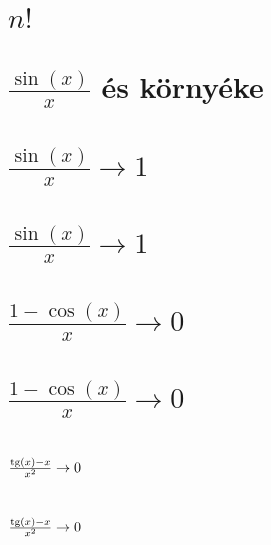 \begin{spacing}{1.2}
\section*{$n!$} \label{DBnthroot3Mo}
\Mo{

}
\vspace{0.5cm}
\newpage
\section*{$\frac{\sin(x)}{x}$ és környéke} \label{DBsin}
\newline
{}
\newline
{}
\vspace{0.5cm}
\newpage
\section*{$\frac{\sin(x)}{x}\to 1$} \label{DBsin1}
\Fa{

}
\vspace{0.5cm}
\newpage
\section*{$\frac{\sin(x)}{x}\to 1$} \label{DBsin1Mo}
\Mo{

}
\vspace{0.5cm}
\newpage
\section*{$\frac{1-\cos(x)}{x}\to 0$} \label{DBsin2}
\Fa{

}
\vspace{0.5cm}
\newpage
\section*{$\frac{1-\cos(x)}{x}\to 0$} \label{DBsin2Mo}
\Mo{

}
\vspace{0.5cm}
\newpage
\section*{$\frac{\text{tg}(x)-x}{x^2}\to 0$} \label{DBsin3}
\Fa{

}
\vspace{0.5cm}
\newpage
\section*{$\frac{\text{tg}(x)-x}{x^2}\to 0$} \label{DBsin3Mo}
\Mo{

}
\vspace{0.5cm}
\newpage

\end{spacing}


